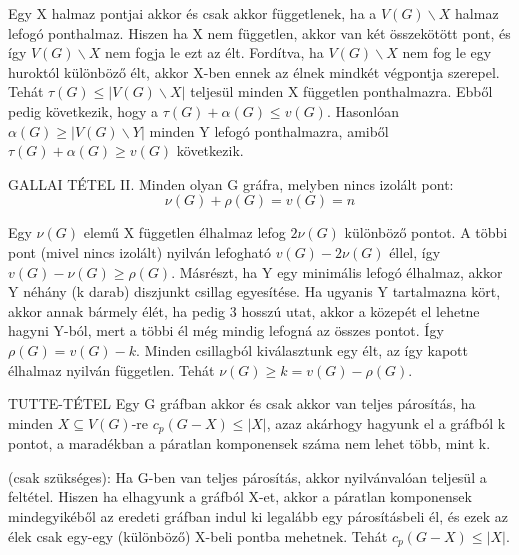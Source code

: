 \begin{bizonyitas}{}
Egy X halmaz pontjai akkor és csak akkor függetlenek, ha a $V(G)\backslash X$ halmaz lefogó ponthalmaz. Hiszen ha X nem független, akkor van két összekötött pont, és így $V(G)\backslash X$ nem fogja le ezt az élt. Fordítva, ha $V(G)\backslash X$ nem fog le egy huroktól különböző élt, akkor X-ben ennek az élnek mindkét végpontja szerepel. Tehát $\tau(G) \leq |V(G)\backslash X|$ teljesül minden X független ponthalmazra. Ebből pedig következik, hogy a $\tau(G) + \alpha(G) \leq v(G)$. Hasonlóan $\alpha(G) \geq |V(G) \backslash Y|$ minden Y lefogó ponthalmazra, amiből $\tau(G) + \alpha(G) \geq v(G)$ következik.
\end{bizonyitas}

\begin{tetel}{GALLAI TÉTEL II.}
Minden olyan G gráfra, melyben nincs izolált pont:
$$\nu(G) + \rho(G) = v(G) = n$$
\end{tetel}

\begin{bizonyitas}{}
Egy $\nu(G)$ elemű X független élhalmaz lefog $2\nu(G)$ különböző pontot. A többi pont (mivel nincs izolált) nyilván lefogható $v(G) - 2\nu(G)$ éllel, így $v(G) - \nu(G) \geq \rho(G)$. Másrészt, ha Y egy minimális lefogó élhalmaz, akkor Y néhány (k darab) diszjunkt csillag egyesítése. Ha ugyanis Y tartalmazna kört, akkor annak bármely élét, ha pedig 3 hosszú utat, akkor a közepét el lehetne hagyni Y-ból, mert a többi él még mindig lefogná az összes pontot. Így $\rho(G) = v(G) - k$. Minden csillagból kiválasztunk egy élt, az így kapott élhalmaz nyilván független. Tehát $\nu(G) \geq k = v(G) - \rho(G)$.
\end{bizonyitas}

\begin{tetel}{TUTTE-TÉTEL}
Egy G gráfban akkor és csak akkor van teljes párosítás, ha minden $X \subseteq V(G)$-re $c_p(G - X)\leq |X|$, azaz akárhogy hagyunk el a gráfból k pontot, a maradékban a páratlan komponensek száma nem lehet több, mint k.
\end{tetel}

\begin{bizonyitas}{}
(csak szükséges): Ha G-ben van teljes párosítás, akkor nyilvánvalóan teljesül a feltétel. Hiszen ha elhagyunk a gráfból X-et, akkor a páratlan komponensek mindegyikéből az eredeti gráfban indul ki legalább egy párosításbeli él, és ezek az élek csak egy-egy (különböző) X-beli pontba mehetnek. Tehát $c_p(G - X) \leq |X|$.
\end{bizonyitas}
